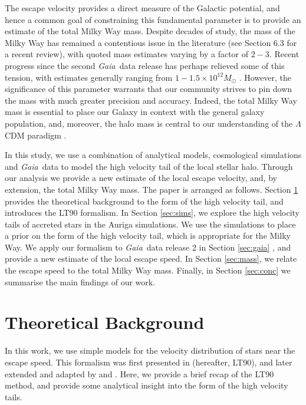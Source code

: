 \documentclass[fleqn,usenatbib]{mnras}
\newcommand{\gaia}		{\emph{Gaia}}
\begin{document}
The escape velocity provides a direct measure of the Galactic potential, and hence a common goal of constraining this fundamental parameter is to provide an estimate of the total Milky Way mass. Despite decades of study, the mass of the Milky Way has remained a contentious issue in the literature (see \citealt{bland16} Section 6.3 for a recent review), with quoted mass estimates varying by a factor of $2-3$. Recent progress since the second \gaia\ data release has perhaps relieved some of this tension, with estimates generally ranging from $1-1.5 \times 10^{12}M_\odot$ \citep[e.g.][]{eadie18, malhan18, watkins18, callingham19, posti19, vasiliev19}. However, the significance of this parameter warrants that our community strives to pin down the mass with much greater precision and accuracy. Indeed, the total Milky Way mass is essential to place our Galaxy in context with the general galaxy population, and, moreover, the halo mass is central to our understanding of the $\Lambda$CDM paradigm \citep[e.g.][]{purcell12, wang12}.

In this study, we use a combination of analytical models, cosmological simulations and \gaia\ data to model the high velocity tail of the local stellar halo. Through our analysis we provide a new estimate of the local escape velocity, and, by extension, the total Milky Way mass. The paper is arranged as follows. Section \ref{sec:theory} provides the theoretical background to the form of the high velocity tail, and introduces the LT90 formalism. In Section \ref{sec:sims}, we explore the high velocity tails of accreted stars in the Auriga simulations. We use the simulations to place a prior on the form of the high velocity tail, which is appropriate for the Milky Way. We apply our formalism to \gaia\ data release 2 in Section \ref{sec:gaia} , and provide a new estimate of the local escape speed. In Section \ref{sec:mass}, we relate the escape speed to the total Milky Way mass. Finally, in Section \ref{sec:conc} we summarise the main findings of our work.

\section{Theoretical Background}
\label{sec:theory}

In this work, we use simple models for the velocity distribution of stars near the escape speed. This formalism was first presented in \cite{lt90} (hereafter, LT90), and later extended and adapted by \cite{smith07} and \cite{piffl14}. Here, we provide a brief recap of the LT90 method, and provide some analytical insight into the form of the high velocity tails.
\end{document}
